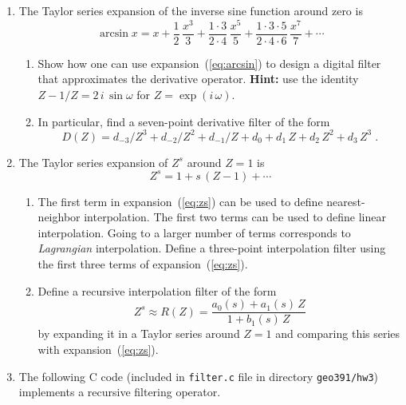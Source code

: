 \begin{enumerate}

\item The Taylor series expansion of the inverse sine function around zero is
\begin{equation}
  \label{eq:arcsin}
  \arcsin{x} = x + \frac{1}{2}\,\frac{x^3}{3} + 
  \frac{1 \cdot 3}{2 \cdot 4}\,\frac{x^5}{5} + 
  \frac{1 \cdot 3 \cdot 5}{2 \cdot 4 \cdot 6}\,\frac{x^7}{7} + 
  \cdots
\end{equation}
\begin{enumerate}
\item Show how one can use expansion~(\ref{eq:arcsin}) to design a
  digital filter that approximates the derivative
  operator. \textbf{Hint:} use the identity $Z-1/Z =
  2\,i\,\sin{\omega}$ for $Z = \exp{(i\,\omega)}$.
\item In particular, find a seven-point derivative filter of the form
\begin{equation}
  \label{eq:d6}
  D(Z) = d_{-3}/Z^{3} + d_{-2}/Z^{2} + d_{-1}/Z + d_0 + 
  d_1\,Z + d_2\,Z^2 + d_3\,Z^3\;.
\end{equation}
\end{enumerate}

\item The Taylor series expansion of $Z^s$ around $Z=1$ is
\begin{equation}
  \label{eq:zs}
  Z^s = 1 + s\,(Z-1) + \cdots  
\end{equation}
\begin{enumerate}
\item The first term in expansion~(\ref{eq:zs}) can be used to
  define nearest-neighbor interpolation. The first two terms can be
  used to define linear interpolation. Going to a larger number of
  terms corresponds to \emph{Lagrangian} interpolation. Define a
  three-point interpolation filter using the first three terms of
  expansion~(\ref{eq:zs}).
\item Define a recursive interpolation filter of the form
\begin{equation}
  \label{eq:rec}
  Z^s \approx R(Z) = \frac{a_0(s) + a_1(s)\,Z}{1 + b_1(s)\,Z}
\end{equation}
by expanding it in a Taylor series around $Z=1$ and comparing this
series with expansion~(\ref{eq:zs}).
\end{enumerate}

\item The following C code (included in \texttt{filter.c} file in
  directory \texttt{geo391/hw3}) implements a recursive filtering
  operator.


\end{enumerate}
